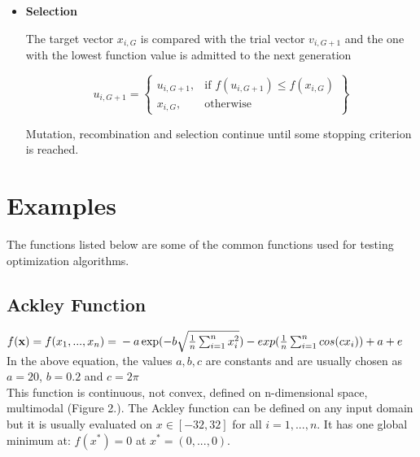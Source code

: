 \documentclass[A4, twocolumn]{article}
\begin{document}
\begin{itemize}
		\item{\textbf{Selection}}
		
		The target vector $x_{i,G}$ is compared with the trial vector $v_{i,G+1}$ and the
		one with the lowest function value is admitted to the next generation
		
		
		\[
		u_{i,G+1} = \left\{
		\begin{array}{lr}
		u_{i,G+1}, & \text{if } f(u_{i,G+1}) \leq f(x_{i, G})\\
		x_{i,G}, & \text{otherwise }
		\end{array} \right\}
		\]
		
		Mutation, recombination and selection continue until some stopping criterion
		is reached.
	\end{itemize}

	\section{\textbf{Examples}}
	
	The functions listed below are some of the common functions used for testing optimization algorithms.
	
	\subsection*{\textbf{Ackley Function}}
	
	$f(\textbf{x}) = f(x_1, ..., x_n) =\\
	 -a \exp(-b\sqrt{\frac{1}{n}\sum_{i=1}^{n}x_i^2})-exp(\frac{1}{n}\sum_{i=1}^{n}cos(cx_i))+ a + e$ \\
	 
	 In the above equation, the values $a, b, c$ are constants and are usually 
	 chosen as $a = 20$, $b = 0.2$ and $c = 2\pi$ \\
	 
	 This function is continuous, not convex, defined on n-dimensional space, multimodal (Figure 2.). The Ackley function can be defined on any input domain but it is usually evaluated on $x \in [-32, 32]$ for all $i = 1, ..., n$. It has one global minimum at: $f(x^*) = 0$ at $x^* = (0, ..., 0)$. 
	 
\end{document}
